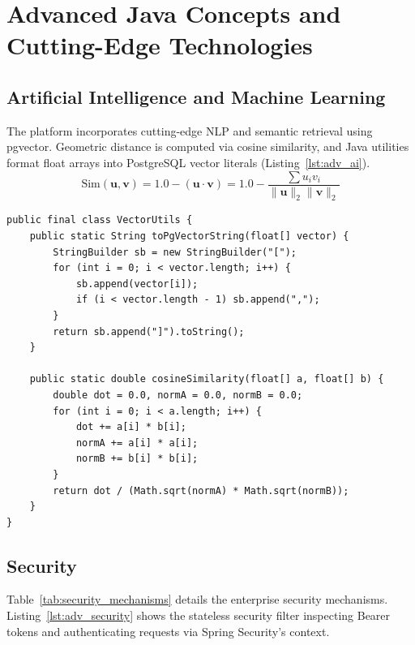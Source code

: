 \documentclass[11pt,a4paper,titlepage]{report}
\begin{document}
\chapter{Advanced Java Concepts and Cutting-Edge Technologies}

\section{Artificial Intelligence and Machine Learning}
The platform incorporates cutting-edge NLP and semantic retrieval using pgvector. Geometric distance is computed via cosine similarity, and Java utilities format float arrays into PostgreSQL vector literals (Listing~\ref{lst:adv_ai}).
\begin{equation}
\text{Sim}(\mathbf{u}, \mathbf{v}) = 1.0 - (\mathbf{u} \cdot \mathbf{v}) = 1.0 - \frac{\sum u_i v_i}{\|\mathbf{u}\|_2 \|\mathbf{v}\|_2}
\end{equation}

\begin{lstlisting}[caption={Vector Formatting and Cosine Similarity Mathematics in Java}, label={lst:adv_ai}]
public final class VectorUtils {
    public static String toPgVectorString(float[] vector) {
        StringBuilder sb = new StringBuilder("[");
        for (int i = 0; i < vector.length; i++) {
            sb.append(vector[i]);
            if (i < vector.length - 1) sb.append(",");
        }
        return sb.append("]").toString();
    }

    public static double cosineSimilarity(float[] a, float[] b) {
        double dot = 0.0, normA = 0.0, normB = 0.0;
        for (int i = 0; i < a.length; i++) {
            dot += a[i] * b[i];
            normA += a[i] * a[i];
            normB += b[i] * b[i];
        }
        return dot / (Math.sqrt(normA) * Math.sqrt(normB));
    }
}
\end{lstlisting}

\section{Security}
Table~\ref{tab:security_mechanisms} details the enterprise security mechanisms. Listing~\ref{lst:adv_security} shows the stateless security filter inspecting Bearer tokens and authenticating requests via Spring Security's context.
\end{document}

